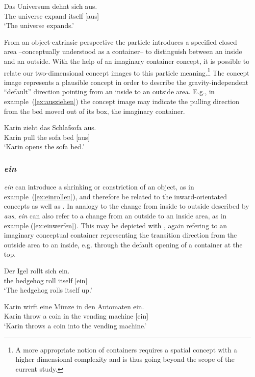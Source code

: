 \documentclass[output=paper]{langsci/langscibook}
\begin{document}
\ea\label{ex:ausdehnen}
\gll Das Universum dehnt sich aus.\\
The universe expand itself [aus]\\
\glt `The universe expands.'
\z

From an object-extrinsic perspective the particle introduces a
specified closed area --conceptually understood as a container-- to
distinguish between an inside and an outside. With the help of an
imaginary container concept, it is possible to relate our
two-dimensional concept images to this particle meaning.\footnote{A more
  appropriate notion of containers requires a spatial concept with a
  higher dimensional complexity and is thus going beyond the scope of
  the current study.} The concept image  represents a
plausible concept in order to describe the gravity-independent
``default'' direction pointing from an inside to an outside area.
E.g., in example~(\ref{ex:ausziehen}) the concept image  may
indicate the pulling direction from the bed moved out of its box, the
imaginary container.

\ea\label{ex:ausziehen}
\gll Karin zieht das Schlafsofa aus.\\
Karin pull the {sofa bed} [aus]\\
\glt `Karin opens the sofa bed.'
\z

\vspace{+1mm}
\subsubsection{\textit{ein}}

\textit{ein} can introduce a shrinking or constriction of an object,
as in example~(\ref{ex:einrollen}), and therefore be related to the
inward-orientated concepts  as well as
. In analogy to the change from inside to outside
described by \textit{aus}, \textit{ein} can also refer to a change
from an outside to an inside area, as in example
(\ref{ex:einwerfen}). This may be depicted with ,
again refering to an imaginary conceptual container representing the
transition direction from the outside area to an inside, e.g.  through
the default opening of a container at the top.

\ea\label{ex:einrollen}
\gll Der Igel rollt sich ein.\\
the hedgehog roll itself [ein]\\
\glt `The hedgehog rolls itself up.'
\z

\ea\label{ex:einwerfen}
\gll Karin wirft eine Münze in den Automaten ein.\\
Karin throw a coin in the {vending machine} [ein]\\
\glt `Karin throws a coin into the vending machine.'
\z
\end{document}
